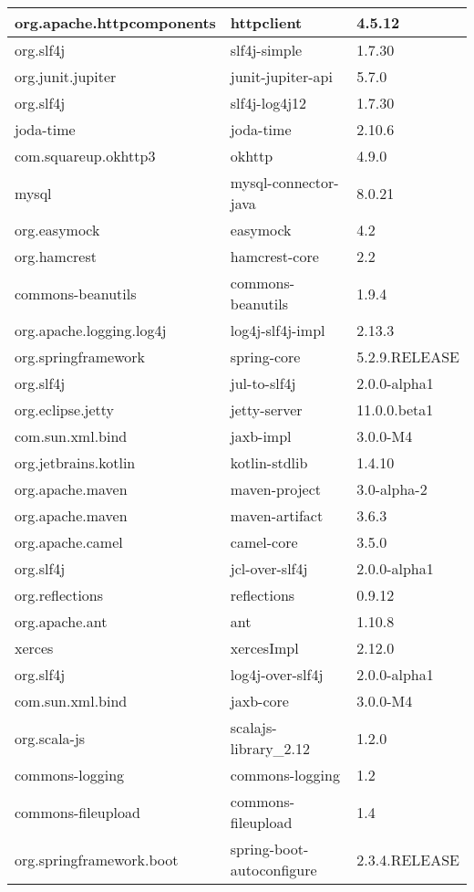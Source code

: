 \begin{appendices}
\begin{longtable}[h]{|l|l|l|}
  org.apache.httpcomponents & httpclient & 4.5.12 \\ \hline
  org.slf4j & slf4j-simple & 1.7.30 \\ \hline
  org.junit.jupiter & junit-jupiter-api & 5.7.0 \\ \hline
  org.slf4j & slf4j-log4j12 & 1.7.30 \\ \hline
  joda-time & joda-time & 2.10.6 \\ \hline
  com.squareup.okhttp3 & okhttp & 4.9.0 \\ \hline
  mysql & mysql-connector-java & 8.0.21 \\ \hline
  org.easymock & easymock & 4.2 \\ \hline
  org.hamcrest & hamcrest-core & 2.2 \\ \hline
  commons-beanutils & commons-beanutils & 1.9.4 \\ \hline
  org.apache.logging.log4j & log4j-slf4j-impl & 2.13.3 \\ \hline
  org.springframework & spring-core & 5.2.9.RELEASE \\ \hline
  org.slf4j & jul-to-slf4j & 2.0.0-alpha1 \\ \hline
  org.eclipse.jetty & jetty-server & 11.0.0.beta1 \\ \hline
  com.sun.xml.bind & jaxb-impl & 3.0.0-M4 \\ \hline
  org.jetbrains.kotlin & kotlin-stdlib & 1.4.10 \\ \hline
  org.apache.maven & maven-project & 3.0-alpha-2 \\ \hline
  org.apache.maven & maven-artifact & 3.6.3 \\ \hline
  org.apache.camel & camel-core & 3.5.0 \\ \hline
  org.slf4j & jcl-over-slf4j & 2.0.0-alpha1 \\ \hline
  org.reflections & reflections & 0.9.12 \\ \hline
  org.apache.ant & ant & 1.10.8 \\ \hline
  xerces & xercesImpl & 2.12.0 \\ \hline
  org.slf4j & log4j-over-slf4j & 2.0.0-alpha1 \\ \hline
  com.sun.xml.bind & jaxb-core & 3.0.0-M4 \\ \hline
  org.scala-js & scalajs-library\_2.12 & 1.2.0 \\ \hline
  commons-logging & commons-logging & 1.2 \\ \hline
  commons-fileupload & commons-fileupload & 1.4 \\ \hline
  org.springframework.boot & spring-boot-autoconfigure & 2.3.4.RELEASE \\ \hline

\end{longtable}
\end{appendices}
